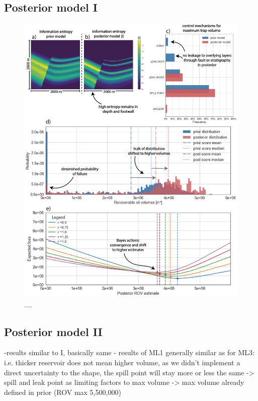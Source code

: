 		\subsection{Posterior model I}
		\begin{figure}[p!]
			\centering
			\includegraphics[width=1\textwidth]{Figures/ML1}
			\caption{....}\label{fig:ML1}
		\end{figure}
		
		\subsection{Posterior model II}%
		-results similar to I, basically same
		- results of ML1 generally similar as for ML3:
		i.e. thicker reservoir does not mean higher volume, as we didn't implement a direct uncertainty to the shape, the spill point will stay more or less the same
		-> spill and leak point as limiting factors to max volume
		-> max volume already defined in prior (ROV max 5,500,000)
	
